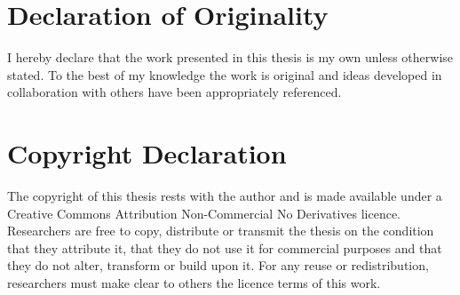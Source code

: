 \mtcaddchapter
\chapter*{Declaration of Originality}
\addtocounter{counter}{-1}




I hereby declare that the work presented in this thesis is my own unless otherwise stated. To the best of my knowledge the work is original and ideas developed in collaboration with others have been appropriately referenced.


\mtcaddchapter
\chapter*{Copyright Declaration}
\addtocounter{counter}{-1}


The copyright of this thesis rests with the author and is made available under a Creative Commons Attribution Non-Commercial No Derivatives licence. Researchers are free to copy, distribute or transmit the thesis on the condition that they attribute it, that they do not use it for commercial purposes and that they do not alter, transform or build upon it. For any reuse or redistribution, researchers must make clear to others the licence terms of this work.